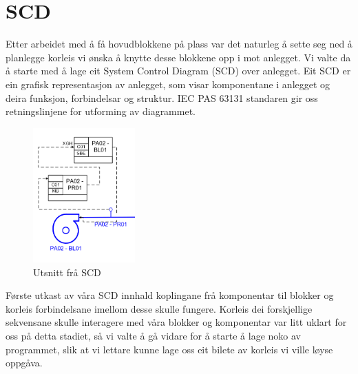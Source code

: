 \section{SCD}
\thispagestyle{fancy}

Etter arbeidet med å få hovudblokkene på plass var det naturleg å sette seg ned å planlegge korleis vi ønska å knytte desse blokkene opp i mot anlegget. 
Vi valte da å starte med å lage eit System Control Diagram (SCD) over anlegget. 
Eit SCD er ein grafisk representasjon av anlegget, som visar komponentane i anlegget og deira funksjon, forbindelsar og struktur. 
IEC PAS 63131 standaren gir oss retningslinjene for utforming av diagrammet.


\begin{figure}[htbp]
    \centering
    \includegraphics[width=0.35\textwidth]{Bilder/Visio_eksempel.png}
    \caption{Utsnitt frå SCD}\label{fig:SCD eksempel}    
\end{figure}


Første utkast av våra SCD innhald koplingane frå komponentar til blokker og korleis forbindelsane imellom desse skulle fungere. 
Korleis dei forskjellige sekvensane skulle interagere med våra blokker og komponentar var litt uklart for oss på detta stadiet, så vi valte å gå vidare for å starte å lage noko av programmet, slik at vi lettare kunne lage oss eit bilete av korleis vi ville løyse oppgåva.

